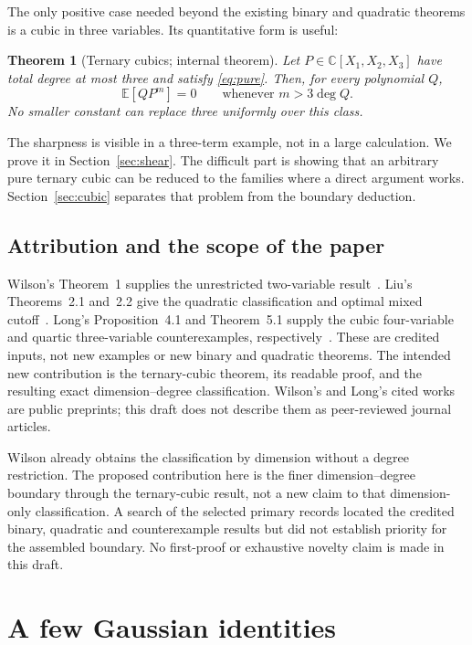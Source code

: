 \documentclass[11pt]{article}
\newtheorem{theorem}{Theorem}[section]
\theoremstyle{definition}\newtheorem{definition}[theorem]{Definition}
\theoremstyle{remark}\newtheorem{remark}[theorem]{Remark}
\newcommand{\E}{\mathbb E}
\newcommand{\C}{\mathbb C}
\begin{document}
The only positive case needed beyond the existing binary and quadratic
theorems is a cubic in three variables. Its quantitative form is useful:

\begin{theorem}[Ternary cubics; internal theorem]\label{thm:cubic}
Let $P\in\C[X_1,X_2,X_3]$ have total degree at most three and satisfy
\eqref{eq:pure}. Then, for every polynomial $Q$,
\begin{equation}\label{eq:cutoff}
 \E[QP^m]=0\qquad\text{whenever }m>3\deg Q.
\end{equation}
No smaller constant can replace three uniformly over this class.
\end{theorem}

The sharpness is visible in a three-term example, not in a large
calculation. We prove it in Section~\ref{sec:shear}. The difficult part
is showing that an arbitrary pure ternary cubic can be reduced to the
families where a direct argument works. Section~\ref{sec:cubic} separates
that problem from the boundary deduction.

\subsection*{Attribution and the scope of the paper}
Wilson's Theorem~1 supplies the unrestricted two-variable
result~\cite{Wilson}. Liu's Theorems~2.1 and~2.2 give the quadratic classification and optimal
mixed cutoff~\cite{Liu}.
Long's Proposition~4.1 and Theorem~5.1 supply the cubic four-variable
and quartic three-variable counterexamples, respectively~\cite{Long}. These are
credited inputs, not new examples or new binary and quadratic theorems.
The intended new contribution is the ternary-cubic theorem, its readable
proof, and the resulting exact dimension--degree classification.
Wilson's and Long's cited works are public preprints; this draft does
not describe them as peer-reviewed journal articles.

Wilson already obtains the classification by dimension without a degree
restriction. The proposed contribution here is the finer dimension--degree
boundary through the ternary-cubic result, not a new claim to that
dimension-only classification. A search of the selected primary records
located the credited binary, quadratic and counterexample results but
did not establish priority for the assembled boundary. No first-proof
or exhaustive novelty claim is made in this draft.


\section{A few Gaussian identities}
\end{document}
